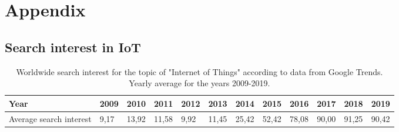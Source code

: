 \section{Appendix}
\subsection{Search interest in IoT}
\label{lSearchInterestInIoT}
\begin{table}[!h]
    \begin{tabular}{|p{2.6cm}||p{0.9cm}|p{0.9cm}|p{0.9cm}|p{0.9cm}|p{0.9cm}|p{0.9cm}|p{0.9cm}|p{0.9cm}|p{0.9cm}|p{0.9cm}|p{0.9cm}|}
    \hline
     Year&2009&2010&2011&2012&2013&2014&2015&2016&2017&2018&2019\\ 
     \hline
     Average search interest&9,17&13,92&11,58&9,92&11,45&25,42&52,42&78,08&90,00&91,25&90,42\\
     \hline
    \end{tabular}
    \caption{Worldwide search interest for the topic of "Internet of Things" according to data from Google Trends. Yearly average for the years 2009-2019.}
    \label{tSearchInterestIoT}
\end{table}
